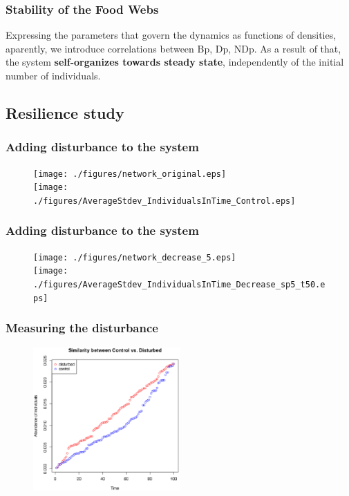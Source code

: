 \documentclass[xcolor=x11names,compress]{beamer}
\renewcommand{\(}{\begin{columns}}
\renewcommand{\)}{\end{columns}}
\newcommand{\<}[1]{\begin{column}{#1}}
\renewcommand{\>}{\end{column}}
\begin{document}
\begin{frame}
\frametitle{Stability of the Food Webs}
\begin{block}{}
Expressing the parameters that govern the dynamics as functions of densities, aparently, we introduce correlations between Bp, Dp, NDp. As a result of that, the system \textbf{self-organizes towards steady state}, independently of the initial number of individuals. 
\end{block}
\end{frame}



\subsection{Resilience study}
\begin{frame}
\frametitle{Adding disturbance to the system}
\begin{figure}
 \texttt{[image: ./figures/network\_original.eps]} \\ 
 \texttt{[image: ./figures/AverageStdev\_IndividualsInTime\_Control.eps]} 
\end{figure}
\end{frame}

\begin{frame}
\frametitle{Adding disturbance to the system}
\begin{figure}
 \texttt{[image: ./figures/network\_decrease\_5.eps]} \\
 \texttt{[image: ./figures/AverageStdev\_IndividualsInTime\_Decrease\_sp5\_t50.eps]}
\end{figure}
\end{frame}

\begin{frame}
\frametitle{Measuring the disturbance}
\begin{figure}
 \includegraphics[width=0.5\textwidth]{./figures/perkins.eps} 
\end{figure}
\end{frame}
\end{document}
